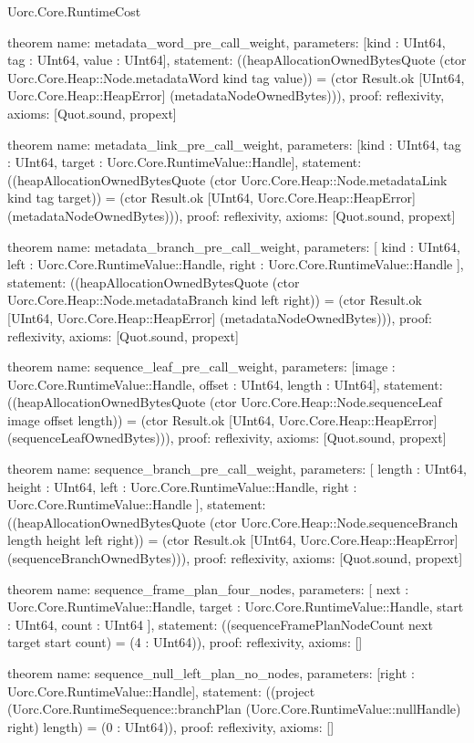 \begin{lexlean}{Uorc.Core.RuntimeCost}
\begin{semanticmodule}
theorem{
  name: metadata_word_pre_call_weight,
  parameters: [kind : UInt64, tag : UInt64, value : UInt64],
  statement: ((heapAllocationOwnedBytesQuote (ctor Uorc.Core.Heap::Node.metadataWord kind tag value)) = (ctor Result.ok [UInt64, Uorc.Core.Heap::HeapError] (metadataNodeOwnedBytes))),
  proof: reflexivity{},
  axioms: [Quot.sound, propext]
}

theorem{
  name: metadata_link_pre_call_weight,
  parameters: [kind : UInt64, tag : UInt64, target : Uorc.Core.RuntimeValue::Handle],
  statement: ((heapAllocationOwnedBytesQuote (ctor Uorc.Core.Heap::Node.metadataLink kind tag target)) = (ctor Result.ok [UInt64, Uorc.Core.Heap::HeapError] (metadataNodeOwnedBytes))),
  proof: reflexivity{},
  axioms: [Quot.sound, propext]
}

theorem{
  name: metadata_branch_pre_call_weight,
  parameters: [
    kind : UInt64,
    left : Uorc.Core.RuntimeValue::Handle,
    right : Uorc.Core.RuntimeValue::Handle
  ],
  statement: ((heapAllocationOwnedBytesQuote (ctor Uorc.Core.Heap::Node.metadataBranch kind left right)) = (ctor Result.ok [UInt64, Uorc.Core.Heap::HeapError] (metadataNodeOwnedBytes))),
  proof: reflexivity{},
  axioms: [Quot.sound, propext]
}

theorem{
  name: sequence_leaf_pre_call_weight,
  parameters: [image : Uorc.Core.RuntimeValue::Handle, offset : UInt64, length : UInt64],
  statement: ((heapAllocationOwnedBytesQuote (ctor Uorc.Core.Heap::Node.sequenceLeaf image offset length)) = (ctor Result.ok [UInt64, Uorc.Core.Heap::HeapError] (sequenceLeafOwnedBytes))),
  proof: reflexivity{},
  axioms: [Quot.sound, propext]
}

theorem{
  name: sequence_branch_pre_call_weight,
  parameters: [
    length : UInt64,
    height : UInt64,
    left : Uorc.Core.RuntimeValue::Handle,
    right : Uorc.Core.RuntimeValue::Handle
  ],
  statement: ((heapAllocationOwnedBytesQuote (ctor Uorc.Core.Heap::Node.sequenceBranch length height left right)) = (ctor Result.ok [UInt64, Uorc.Core.Heap::HeapError] (sequenceBranchOwnedBytes))),
  proof: reflexivity{},
  axioms: [Quot.sound, propext]
}

theorem{
  name: sequence_frame_plan_four_nodes,
  parameters: [
    next : Uorc.Core.RuntimeValue::Handle,
    target : Uorc.Core.RuntimeValue::Handle,
    start : UInt64,
    count : UInt64
  ],
  statement: ((sequenceFramePlanNodeCount next target start count) = (4 : UInt64)),
  proof: reflexivity{},
  axioms: []
}

theorem{
  name: sequence_null_left_plan_no_nodes,
  parameters: [right : Uorc.Core.RuntimeValue::Handle],
  statement: ((project (Uorc.Core.RuntimeSequence::branchPlan (Uorc.Core.RuntimeValue::nullHandle) right) length) = (0 : UInt64)),
  proof: reflexivity{},
  axioms: []
}


\end{semanticmodule}
\end{lexlean}
